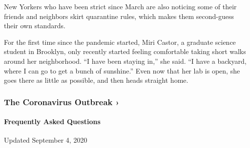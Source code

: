 New Yorkers who have been strict since March are also noticing some of
their friends and neighbors skirt quarantine rules, which makes them
second-guess their own standards.

For the first time since the pandemic started, Miri Castor, a graduate
science student in Brooklyn, only recently started feeling comfortable
taking short walks around her neighborhood. ``I have been staying in,''
she said. ``I have a backyard, where I can go to get a bunch of
sunshine.'' Even now that her lab is open, she goes there as little as
possible, and then heads straight home.

\href{https://www.nytimes3xbfgragh.onion/news-event/coronavirus?action=click\&pgtype=Article\&state=default\&region=MAIN_CONTENT_3\&context=storylines_faq}{}

\hypertarget{the-coronavirus-outbreak-}{%
\subsubsection{The Coronavirus Outbreak
›}\label{the-coronavirus-outbreak-}}

\hypertarget{frequently-asked-questions}{%
\paragraph{Frequently Asked
Questions}\label{frequently-asked-questions}}

Updated September 4, 2020

